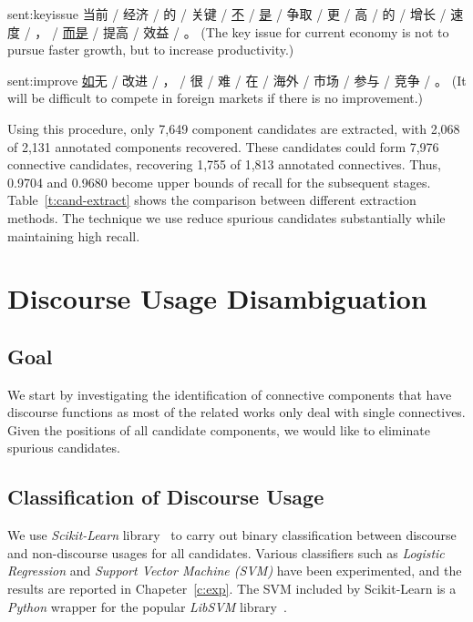 \begin{sent}{sent:keyissue}{}
    当前 / 经济 / 的 / 关键 / \underline{不} / \underline{是} / 争取 / 更 /
    高 / 的 / 增长 / 速度 / ， / \underline{而是} / 提高 / 效益 / 。
    (The key issue for current economy is not to pursue faster growth, but to
    increase productivity.)
\end{sent}

\begin{sent}{sent:improve}{}
    \underline{如}无 / 改进 / ， / 很 / 难 / 在 / 海外 / 市场 / 参与 / 竞争 /
    。 (It will be difficult to compete in foreign markets if there is no
    improvement.)
\end{sent}

Using this procedure, only 7,649 component candidates are extracted, with 2,068 of 2,131 annotated
components recovered. These candidates could form 7,976 connective candidates, recovering
1,755 of 1,813 annotated connectives. Thus, 0.9704 and 0.9680 become upper bounds of recall
for the subsequent stages. Table~\ref{t:cand-extract} shows the comparison between different
extraction methods. The technique we use reduce spurious candidates substantially while
maintaining high recall.



\section{Discourse Usage Disambiguation}

\subsection{Goal}

We start by investigating the identification of connective components that have discourse functions
as most of the related works only deal with single connectives. Given the positions of all candidate
components, we would like to eliminate spurious candidates.

\subsection{Classification of Discourse Usage}

We use \textit{Scikit-Learn} library~\citep{scikit-learn} to carry out binary classification between discourse
and non-discourse usages for all candidates. Various classifiers such as \textit{Logistic Regression}
and \textit{Support Vector Machine (SVM)} have been experimented, and the results are
reported in Chapeter~\ref{c:exp}. The SVM included by Scikit-Learn is a \textit{Python} wrapper for the popular
\textit{LibSVM} library~\citep{CC01a}.

